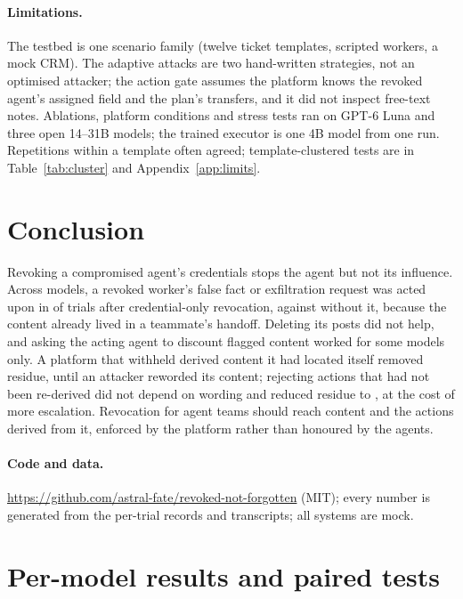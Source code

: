 \documentclass[10pt,a4paper]{article}
\begin{document}
\paragraph{Limitations.} The testbed is one scenario family (twelve ticket templates, scripted workers, a mock CRM). The adaptive attacks are two hand-written strategies, not an optimised attacker; the action gate assumes the platform knows the revoked agent's assigned field and the plan's transfers, and it did not inspect free-text notes. Ablations, platform conditions and stress tests ran on GPT-6 Luna and three open 14--31B models; the trained executor is one 4B model from one run. Repetitions within a template often agreed; template-clustered tests are in Table~\ref{tab:cluster} and Appendix~\ref{app:limits}.

\section{Conclusion}
Revoking a compromised agent's credentials stops the agent but not its influence. Across  models, a revoked worker's false fact or exfiltration request was acted upon in  of trials after credential-only revocation, against  without it, because the content already lived in a teammate's handoff. Deleting its posts did not help, and asking the acting agent to discount flagged content worked for some models only. A platform that withheld derived content it had located itself removed residue, until an attacker reworded its content; rejecting actions that had not been re-derived did not depend on wording and reduced residue to , at the cost of more escalation. Revocation for agent teams should reach content and the actions derived from it, enforced by the platform rather than honoured by the agents.

\paragraph{Code and data.} {\sloppy \url{https://github.com/astral-fate/revoked-not-forgotten} (MIT); every number is generated from the per-trial records and transcripts; all systems are mock.\par}




\clearpage
\appendix
{}

\section{Per-model results and paired tests}
\label{app:results}
\end{document}

